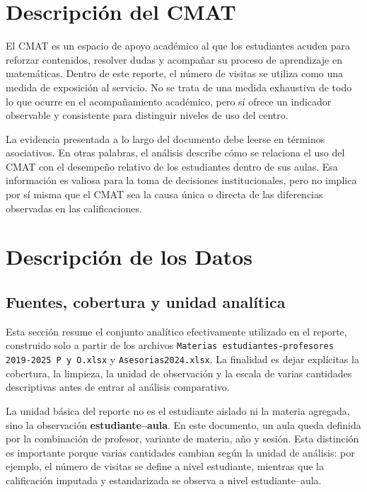 \documentclass[8pt,a4paper]{article} %
\numberwithin{figure}{subsection}
\begin{document}
\FloatBarrier
\newpage
\section{Descripción del CMAT}
El CMAT es un espacio de apoyo académico al que los estudiantes acuden para reforzar contenidos, resolver dudas y acompañar su proceso de aprendizaje en matemáticas. Dentro de este reporte, el número de visitas se utiliza como una medida de exposición al servicio. No se trata de una medida exhaustiva de todo lo que ocurre en el acompañamiento académico, pero sí ofrece un indicador observable y consistente para distinguir niveles de uso del centro.

La evidencia presentada a lo largo del documento debe leerse en términos asociativos. En otras palabras, el análisis describe cómo se relaciona el uso del CMAT con el desempeño relativo de los estudiantes dentro de sus aulas. Esa información es valiosa para la toma de decisiones institucionales, pero no implica por sí misma que el CMAT sea la causa única o directa de las diferencias observadas en las calificaciones.



\FloatBarrier
\newpage
\section{Descripción de los Datos}

\subsection{Fuentes, cobertura y unidad analítica}
Esta sección resume el conjunto analítico efectivamente utilizado en el reporte, construido solo a partir de los archivos \texttt{Materias estudiantes-profesores 2019-2025 P y O.xlsx} y \texttt{Asesorias2024.xlsx}. La finalidad es dejar explícitas la cobertura, la limpieza, la unidad de observación y la escala de varias cantidades descriptivas antes de entrar al análisis comparativo.



La unidad básica del reporte no es el estudiante aislado ni la materia agregada, sino la observación \textbf{estudiante--aula}. En este documento, un aula queda definida por la combinación de profesor, variante de materia, año y sesión. Esta distinción es importante porque varias cantidades cambian según la unidad de análisis: por ejemplo, el número de visitas se define a nivel estudiante, mientras que la calificación imputada y estandarizada se observa a nivel estudiante--aula.
\end{document}

